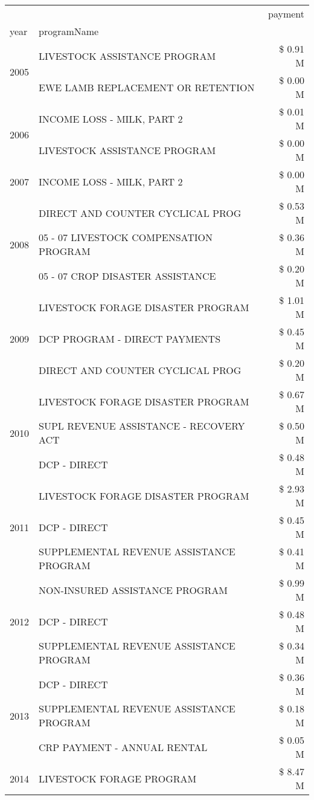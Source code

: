 \begin{tabular}{llr}
\toprule
 &  & payment \\
year & programName &  \\
\midrule
\multirow[t]{2}{*}{2005} & LIVESTOCK ASSISTANCE PROGRAM & \$ 0.91 M \\
 & EWE LAMB REPLACEMENT OR RETENTION & \$ 0.00 M \\
\cline{1-3}
\multirow[t]{2}{*}{2006} & INCOME LOSS - MILK, PART 2 & \$ 0.01 M \\
 & LIVESTOCK ASSISTANCE PROGRAM & \$ 0.00 M \\
\cline{1-3}
2007 & INCOME LOSS - MILK, PART 2 & \$ 0.00 M \\
\cline{1-3}
\multirow[t]{3}{*}{2008} & DIRECT AND COUNTER CYCLICAL PROG & \$ 0.53 M \\
 & 05 - 07 LIVESTOCK COMPENSATION PROGRAM & \$ 0.36 M \\
 & 05 - 07 CROP DISASTER ASSISTANCE & \$ 0.20 M \\
\cline{1-3}
\multirow[t]{3}{*}{2009} & LIVESTOCK FORAGE DISASTER  PROGRAM & \$ 1.01 M \\
 & DCP PROGRAM - DIRECT PAYMENTS & \$ 0.45 M \\
 & DIRECT AND COUNTER CYCLICAL PROG & \$ 0.20 M \\
\cline{1-3}
\multirow[t]{3}{*}{2010} & LIVESTOCK FORAGE DISASTER PROGRAM & \$ 0.67 M \\
 & SUPL REVENUE ASSISTANCE - RECOVERY ACT & \$ 0.50 M \\
 & DCP - DIRECT & \$ 0.48 M \\
\cline{1-3}
\multirow[t]{3}{*}{2011} & LIVESTOCK FORAGE DISASTER PROGRAM & \$ 2.93 M \\
 & DCP - DIRECT & \$ 0.45 M \\
 & SUPPLEMENTAL REVENUE ASSISTANCE PROGRAM & \$ 0.41 M \\
\cline{1-3}
\multirow[t]{3}{*}{2012} & NON-INSURED ASSISTANCE PROGRAM & \$ 0.99 M \\
 & DCP - DIRECT & \$ 0.48 M \\
 & SUPPLEMENTAL REVENUE ASSISTANCE PROGRAM & \$ 0.34 M \\
\cline{1-3}
\multirow[t]{3}{*}{2013} & DCP - DIRECT & \$ 0.36 M \\
 & SUPPLEMENTAL REVENUE ASSISTANCE PROGRAM & \$ 0.18 M \\
 & CRP PAYMENT - ANNUAL RENTAL & \$ 0.05 M \\
\cline{1-3}
\multirow[t]{3}{*}{2014} & LIVESTOCK FORAGE PROGRAM & \$ 8.47 M \\

\end{tabular}

